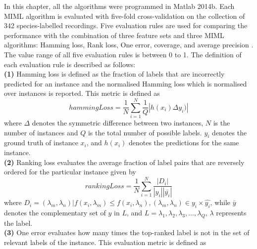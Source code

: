 \label{ch6:eveluationMetric}
In this chapter, all the algorithms were programmed in Matlab 2014b. Each MIML algorithm is evaluated with five-fold cross-validation on the collection of 342 species-labelled recordings. 
Five evaluation rules are used for comparing the performance with the combination of three feature sets and three MIML algorithms: Hamming loss, Rank loss, One error, coverage, and  average precision \citep{Madjarov20123084, zhou2008miml}. The value range of all five evaluation rules is between 0 to 1. The definition of each evaluation rule is described as follows:
\\
\textbf{(1)} Hamming loss is defined as the fraction of labels that are incorrectly predicted for an instance and the normalised Hamming loss which is normalised over instances is reported. This metric is defined as
\begin{equation}
hammingLoss = \frac{1}{N}\sum_{i=1}^{N}\frac{1}{Q}|h(x_{i})\Delta y_{i})|
\end{equation}
where $\Delta$ denotes the symmetric difference between two instances, $N$ is the number of instances and $Q$ is the total number of possible labels. $y_{i}$ denotes the ground truth of instance $x_{i}$, and $h(x_{i})$ denotes the predictions for the same instance. 
\\
\textbf{(2)} Ranking loss evaluates the average fraction of label pairs that are reversely ordered for the particular instance given by
\begin{equation}
rankingLoss = \frac{1}{N}\sum_{i=1}^{N}\frac{|D_{i}|}{|y_{i}||\bar{y_{i}}|}
\end{equation}
where $D_{i}={(\lambda_{m},\lambda_{n})| f(x_{i}, \lambda_{m}) \leq f(x_{i}, \lambda_{n}), (\lambda_{m}, \lambda_{n}) \in y_{i} \times \hat{y_{i}}}$,
while $\bar{y}$ denotes the complementary set of $y$ in $L$, and $L={\lambda_{1}, \lambda_{2}, \lambda_{3},..., \lambda_{Q}}$, $\lambda$ represents the label.
\\
\textbf{(3)} One error evaluates how many times the top-ranked label is
not in the set of relevant labels of the instance. This evaluation metric is defined as

